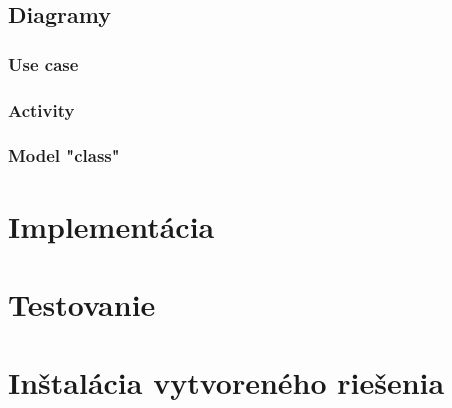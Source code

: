 \subsection{Diagramy}
\subsubsection{Use case}
\subsubsection{Activity}
\subsubsection{Model "class"}


\section{Implementácia}

\section{Testovanie}

\section{Inštalácia vytvoreného riešenia}